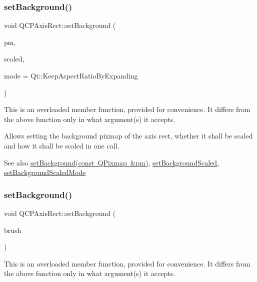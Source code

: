 \subsubsection{\texorpdfstring{setBackground()}{setBackground()}\hspace{0.1cm}{\footnotesize\ttfamily [2/3]}}
{\footnotesize\ttfamily void Q\+C\+P\+Axis\+Rect\+::set\+Background (\begin{DoxyParamCaption}\item[{const Q\+Pixmap \&}]{pm,  }\item[{bool}]{scaled,  }\item[{Qt\+::\+Aspect\+Ratio\+Mode}]{mode = {\ttfamily Qt\+:\+:KeepAspectRatioByExpanding} }\end{DoxyParamCaption})}

This is an overloaded member function, provided for convenience. It differs from the above function only in what argument(s) it accepts.

Allows setting the background pixmap of the axis rect, whether it shall be scaled and how it shall be scaled in one call.

\begin{DoxySeeAlso}{See also}
\mbox{\hyperlink{class_q_c_p_axis_rect_af615ab5e52b8e0a9a0eff415b6559db5}{set\+Background(const Q\+Pixmap \&pm)}}, \mbox{\hyperlink{class_q_c_p_axis_rect_ae6d36c3e0e968ffb991170a018e7b503}{set\+Background\+Scaled}}, \mbox{\hyperlink{class_q_c_p_axis_rect_a5ef77ea829c9de7ba248e473f48f7305}{set\+Background\+Scaled\+Mode}} 
\end{DoxySeeAlso}
\mbox{\label{class_q_c_p_axis_rect_a22a22b8668735438dc06f9a55fe46b33}} 
\subsubsection{\texorpdfstring{setBackground()}{setBackground()}\hspace{0.1cm}{\footnotesize\ttfamily [3/3]}}
{\footnotesize\ttfamily void Q\+C\+P\+Axis\+Rect\+::set\+Background (\begin{DoxyParamCaption}\item[{const Q\+Brush \&}]{brush }\end{DoxyParamCaption})}

This is an overloaded member function, provided for convenience. It differs from the above function only in what argument(s) it accepts.

